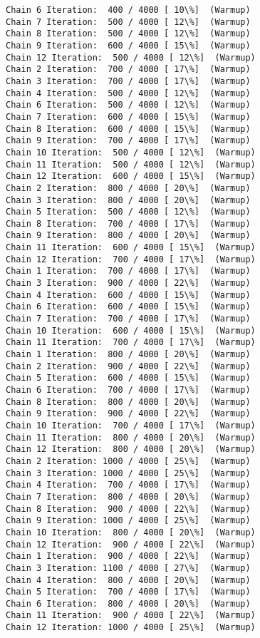 \documentclass[11pt]{article}
\begin{document}
\begin{Verbatim}[commandchars=\\\{\}]
Chain 6 Iteration:  400 / 4000 [ 10\%]  (Warmup)
Chain 7 Iteration:  500 / 4000 [ 12\%]  (Warmup)
Chain 8 Iteration:  500 / 4000 [ 12\%]  (Warmup)
Chain 9 Iteration:  600 / 4000 [ 15\%]  (Warmup)
Chain 12 Iteration:  500 / 4000 [ 12\%]  (Warmup)
Chain 2 Iteration:  700 / 4000 [ 17\%]  (Warmup)
Chain 3 Iteration:  700 / 4000 [ 17\%]  (Warmup)
Chain 4 Iteration:  500 / 4000 [ 12\%]  (Warmup)
Chain 6 Iteration:  500 / 4000 [ 12\%]  (Warmup)
Chain 7 Iteration:  600 / 4000 [ 15\%]  (Warmup)
Chain 8 Iteration:  600 / 4000 [ 15\%]  (Warmup)
Chain 9 Iteration:  700 / 4000 [ 17\%]  (Warmup)
Chain 10 Iteration:  500 / 4000 [ 12\%]  (Warmup)
Chain 11 Iteration:  500 / 4000 [ 12\%]  (Warmup)
Chain 12 Iteration:  600 / 4000 [ 15\%]  (Warmup)
Chain 2 Iteration:  800 / 4000 [ 20\%]  (Warmup)
Chain 3 Iteration:  800 / 4000 [ 20\%]  (Warmup)
Chain 5 Iteration:  500 / 4000 [ 12\%]  (Warmup)
Chain 8 Iteration:  700 / 4000 [ 17\%]  (Warmup)
Chain 9 Iteration:  800 / 4000 [ 20\%]  (Warmup)
Chain 11 Iteration:  600 / 4000 [ 15\%]  (Warmup)
Chain 12 Iteration:  700 / 4000 [ 17\%]  (Warmup)
Chain 1 Iteration:  700 / 4000 [ 17\%]  (Warmup)
Chain 3 Iteration:  900 / 4000 [ 22\%]  (Warmup)
Chain 4 Iteration:  600 / 4000 [ 15\%]  (Warmup)
Chain 6 Iteration:  600 / 4000 [ 15\%]  (Warmup)
Chain 7 Iteration:  700 / 4000 [ 17\%]  (Warmup)
Chain 10 Iteration:  600 / 4000 [ 15\%]  (Warmup)
Chain 11 Iteration:  700 / 4000 [ 17\%]  (Warmup)
Chain 1 Iteration:  800 / 4000 [ 20\%]  (Warmup)
Chain 2 Iteration:  900 / 4000 [ 22\%]  (Warmup)
Chain 5 Iteration:  600 / 4000 [ 15\%]  (Warmup)
Chain 6 Iteration:  700 / 4000 [ 17\%]  (Warmup)
Chain 8 Iteration:  800 / 4000 [ 20\%]  (Warmup)
Chain 9 Iteration:  900 / 4000 [ 22\%]  (Warmup)
Chain 10 Iteration:  700 / 4000 [ 17\%]  (Warmup)
Chain 11 Iteration:  800 / 4000 [ 20\%]  (Warmup)
Chain 12 Iteration:  800 / 4000 [ 20\%]  (Warmup)
Chain 2 Iteration: 1000 / 4000 [ 25\%]  (Warmup)
Chain 3 Iteration: 1000 / 4000 [ 25\%]  (Warmup)
Chain 4 Iteration:  700 / 4000 [ 17\%]  (Warmup)
Chain 7 Iteration:  800 / 4000 [ 20\%]  (Warmup)
Chain 8 Iteration:  900 / 4000 [ 22\%]  (Warmup)
Chain 9 Iteration: 1000 / 4000 [ 25\%]  (Warmup)
Chain 10 Iteration:  800 / 4000 [ 20\%]  (Warmup)
Chain 12 Iteration:  900 / 4000 [ 22\%]  (Warmup)
Chain 1 Iteration:  900 / 4000 [ 22\%]  (Warmup)
Chain 3 Iteration: 1100 / 4000 [ 27\%]  (Warmup)
Chain 4 Iteration:  800 / 4000 [ 20\%]  (Warmup)
Chain 5 Iteration:  700 / 4000 [ 17\%]  (Warmup)
Chain 6 Iteration:  800 / 4000 [ 20\%]  (Warmup)
Chain 11 Iteration:  900 / 4000 [ 22\%]  (Warmup)
Chain 12 Iteration: 1000 / 4000 [ 25\%]  (Warmup)

\end{Verbatim}
\end{document}
